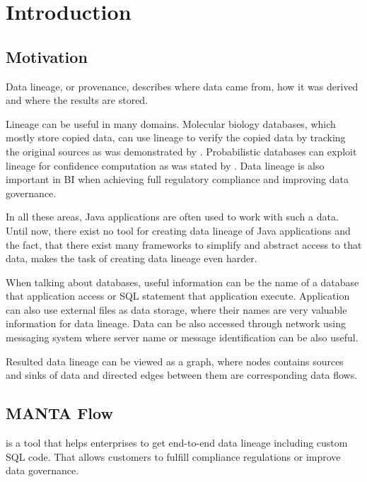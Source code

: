 
\chapter{Introduction}



\section{Motivation}

Data lineage, or provenance, describes where data came from,
how it was derived and where the results are stored.

Lineage can be useful in many domains.
Molecular biology databases, which mostly store copied data,
can use lineage to verify the copied data by tracking the original
sources as was demonstrated by \citet{DataLineageInBioInformatics}.
Probabilistic databases can exploit lineage for confidence
computation as was stated by \citet{DataLineageInProbabilisticDatabases}.
Data lineage is also important in BI when achieving full regulatory compliance
and improving data governance.

In all these areas, Java applications are often used to work
with such a data.
Until now, there exist no tool for creating data lineage of
Java applications and the fact, that there exist many frameworks
to simplify and abstract access to that data,
makes the task of creating data lineage even harder.

When talking about databases, useful information can be the 
name of a database that application access or SQL statement that application execute.
Application can also use external files as data storage, where their names
are very valuable information for data lineage.
Data can be also accessed through network using messaging system
where server name or message identification can be also useful.

Resulted data lineage can be viewed as a graph, where nodes
contains sources and sinks of data and directed edges
between them are corresponding data flows.




\section{MANTA Flow}

\citet{MantaFlow} is a tool that helps enterprises to get end-to-end
data lineage including custom SQL code. That allows customers to fulfill
compliance regulations or improve data governance.

